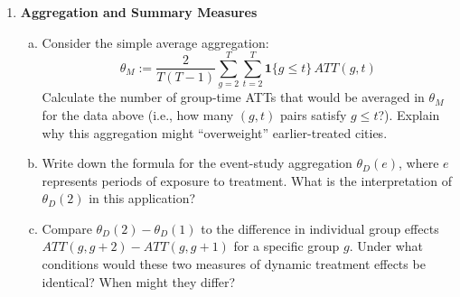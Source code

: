 \documentclass[12pt,a4paper]{article}
\begin{document}
\begin{enumerate}
\item \textbf{Aggregation and Summary Measures}
\begin{enumerate}[(a)]
\item Consider the simple average aggregation:
\begin{equation*}
\theta_M := \frac{2}{T(T-1)}\sum_{g=2}^{T}\sum_{t=2}^{T}\mathbf{1}\{g \leq t\}\,ATT(g, t)
\end{equation*}
Calculate the number of group-time ATTs that would be averaged in $\theta_M$ for the data above (i.e., how many $(g, t)$ pairs satisfy $g \leq t$?). Explain why this aggregation might ``overweight'' earlier-treated cities.
\item Write down the formula for the event-study aggregation $\theta_D(e)$, where $e$ represents periods of exposure to treatment. What is the interpretation of $\theta_D(2)$ in this application?
\item Compare $\theta_D(2)-\theta_D(1)$ to the difference in individual group effects $ATT(g, g+2) - ATT(g, g+1)$ for a specific group $g$. Under what conditions would these two measures of dynamic treatment effects be identical? When might they differ?
\end{enumerate}

\end{enumerate}
\end{document}
